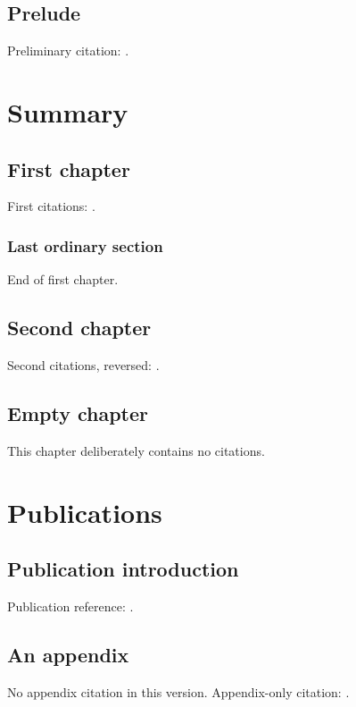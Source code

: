 \documentclass[openright]{book}
\begin{document}
\frontmatter
\chapter*{Prelude}
Preliminary citation: \cite{prelude}.
\tableofcontents
\mainmatter
\ifdefined\TestCompendium\part{Summary}\fi
\chapter{First chapter}
First citations: \cite{alpha,beta}.
\nocite{explicit}
\section{Last ordinary section}
End of first chapter.
\chapter{Second chapter}
Second citations, reversed: \cite{beta,alpha}.
\chapter{Empty chapter}
This chapter deliberately contains no citations.

\ifdefined\TestCompendium
  \part{Publications}
  \chapter{Publication introduction}
  Publication reference: .
\else
  \begin{appendices}
    \chapter{An appendix}
    \ifdefined\TestOmitAppendixReference
      No appendix citation in this version.
    \else
      Appendix-only citation: \cite{gamma}.
    \fi
  \end{appendices}
\fi
\backmatter
\end{document}
